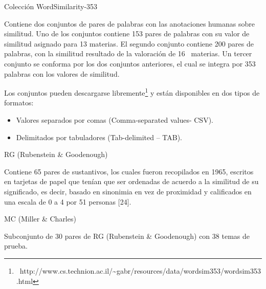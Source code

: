\documentclass[letterpaper]{article}
\newcommand\textstylebibuscitbase[1]{#1}
\newcommand\liststyleWWviiiNumxii{%
\renewcommand\labelitemi{{\textbullet}}
\renewcommand\labelitemii{{\textbullet}}
\renewcommand\labelitemiii{{\textbullet}}
\renewcommand\labelitemiv{{\textbullet}}
}
\begin{document}
\bigskip

{\sffamily
Colecci\'on WordSimilarity-353}


\bigskip

{\sffamily
Contiene dos conjuntos de pares de palabras con las anotaciones humanas
sobre similitud. Uno de los conjuntos contiene 153 pares de palabras
con su valor de similitud asignado para 13 materias. El segundo
conjunto contiene 200 pares de palabras, con la similitud resultado de
la valoraci\'on de 16 \ materias. Un tercer conjunto se conforma por
los dos conjuntos anteriores, el cual se integra por 353 palabras con
los valores de similitud.}


\bigskip

{\sffamily
\foreignlanguage{spanish}{Los conjuntos pueden descargarse
libremente}\footnote{\ http://www.cs.technion.ac.il/\~{}gabr/resources/data/wordsim353/wordsim353.html}\foreignlanguage{spanish}{
y est\'an disponibles en dos tipos }\foreignlanguage{spanish}{de
formatos:}}


\bigskip

\liststyleWWviiiNumxii
\begin{itemize}
\item {\sffamily
Valores separados por comas (Comma-separated values- CSV).}
\item {\sffamily
Delimitados por tabuladores (Tab-delimited -- TAB).}
\end{itemize}

\bigskip

{\sffamily
RG (Rubenstein \& Goodenough)}


\bigskip

{\sffamily
\foreignlanguage{spanish}{Contiene 65 pares de sustantivos, los cuales
fueron recopilados en 1965, escritos en
}\foreignlanguage{spanish}{tarjetas de papel que ten\'ian que ser
ordenadas de acuerdo a la similitud de su significado, es decir, basado
en sinonimia en vez de proximidad y
}\foreignlanguage{spanish}{calificados en una escala de 0 a 4 por 51
personas
}\textstylebibuscitbase{\foreignlanguage{spanish}{[24]}}\foreignlanguage{spanish}{.}}


\bigskip

{\sffamily
MC (Miller \& Charles)}


\bigskip

{\sffamily
Subconjunto de 30 pares de RG (Rubenstein \& Goodenough) con 38 temas de
prueba.}
\end{document}
